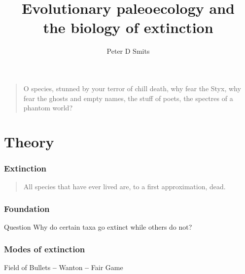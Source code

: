 \documentclass{beamer}
\title{Evolutionary paleoecology and \\the biology of extinction}
\author{Peter D Smits}
\institute{Committee on Evolutionary Biology, University of Chicago}
\begin{document}
\begin{frame}
  \begin{quotation}
    O species, stunned by your terror of chill death, why fear the Styx, why
    fear the ghosts and empty names, the stuff of poets, the spectres of a
    phantom world?

    \vspace{0.5cm}

    \tiny{}
  \end{quotation}
\end{frame}

\begin{frame}
  \maketitle
\end{frame}

\begin{frame}
  \tableofcontents
\end{frame}


\section{Theory}

\begin{frame}
  \frametitle{Extinction}

  \begin{quotation}
    All species that have ever lived are, to a first approximation, dead.

    \tiny{}
  \end{quotation}
\end{frame}

\begin{frame}
  \frametitle{Foundation}

  \begin{alertblock}{Question}
    Why do certain taxa go extinct while others do not?
  \end{alertblock}
\end{frame}

\begin{frame}
  \frametitle{Modes of extinction}

   Field of Bullets 
   \textbf{--} 
   Wanton 
   \textbf{--} 
   Fair Game 

  \bigskip

  \tiny{}

\end{frame}
\end{document}
